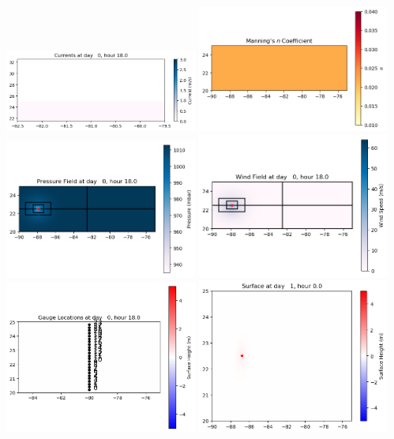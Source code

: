 \documentclass[11pt]{article}
\begin{document}
\includegraphics[width=0.475\textwidth]{frame0003fig1004.png}
\vskip 10pt 
\includegraphics[width=0.475\textwidth]{frame0003fig1005.png}
\includegraphics[width=0.475\textwidth]{frame0003fig1006.png}
\vskip 10pt 
\includegraphics[width=0.475\textwidth]{frame0003fig1007.png}
\includegraphics[width=0.475\textwidth]{frame0003fig1008.png}
\vskip 10pt 
\includegraphics[width=0.475\textwidth]{frame0004fig1001.png}
\end{document}
